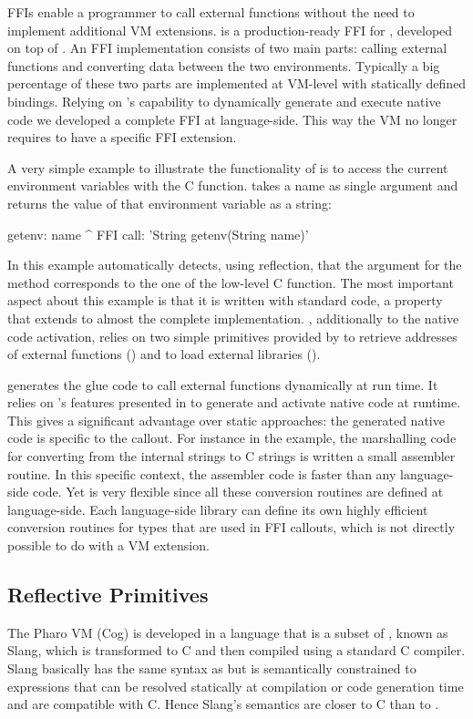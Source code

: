 FFIs enable a programmer to call external functions without the need to implement additional VM extensions.
\NB \cite{Brun13a} is a production-ready FFI for \PH, developed on top of \B.
An FFI implementation consists of two main parts: calling external functions and converting data between the two environments.
Typically a big percentage of these two parts are implemented at VM-level with statically defined bindings.
Relying on \B's capability to dynamically generate and execute native code we developed a complete FFI at language-side.
This way the VM no longer requires to have a specific FFI extension.

A very simple example to illustrate the functionality of \NB is to access the current environment variables with the  C function.
 takes a name as single argument and returns the value of that environment variable as a string:
%
\begin{stcode}{4}
getenv: name
    ^ FFI call: 'String getenv(String name)'
\end{stcode}
%
In this example \NB automatically detects, using reflection, that the argument for the \PH method corresponds to the one of the low-level C function.
The most important aspect about this example is that it is written with standard \ST code, a property that extends to almost the complete implementation.
\NB, additionally to the native code activation, relies on two simple primitives provided by \B to retrieve addresses of external functions () and to load external libraries ().

\NB generates the glue code to call external functions dynamically at run time.
It relies on \B's features presented in  to generate and activate native code at runtime.
This gives \NB a significant advantage over static approaches: the generated native code is specific to the callout.
For instance in the  example, the marshalling code for converting from the internal \PH strings to C strings is written a small assembler routine.
In this specific context, the assembler code is faster than any language-side code.
Yet \NB is very flexible since all these conversion routines are defined at language-side. 
Each language-side library can define its own highly efficient conversion routines for types that are used in FFI callouts, which is not directly possible to do with a VM extension.


\subsection{Reflective Primitives}
The Pharo VM (Cog) is developed in a language that is a subset of \ST, known as Slang, which is transformed to C and then compiled using a standard C compiler.  
Slang basically has the same syntax as \ST but is semantically constrained to expressions that can be resolved statically at compilation or code generation time and are compatible with C.
Hence Slang's semantics are closer to C than to \ST. 

